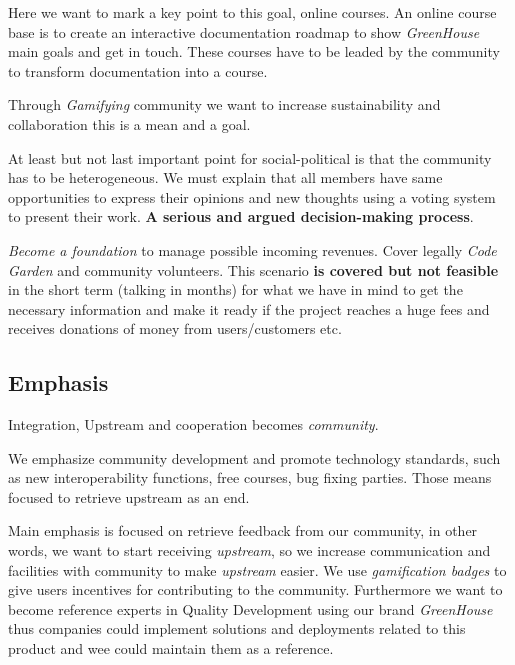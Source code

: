 \documentclass[11pt]{scrartcl}
\begin{document}
\par Here we want to mark a key point to this goal, online courses. An online course base is to create an interactive documentation roadmap to show \emph{GreenHouse} main goals and get in touch. These courses have to be leaded by the community to transform documentation into a course.

\par Through \emph{Gamifying} community we want to increase sustainability and collaboration this is a mean and a goal.

\par At least but not last important point for social-political is that the community has to be heterogeneous. We must explain that all members have same opportunities to express their opinions and new thoughts using a voting system to present their work. \textbf{A serious and argued decision-making process}.

\par \emph{Become a foundation} to manage possible incoming revenues. Cover legally \emph{Code Garden} and community volunteers. This scenario \textbf{is covered but not feasible} in the short term (talking in months) for what we have in mind to get the necessary information and make it ready if the project reaches a huge fees and receives donations of money from users/customers etc.


\subsection{Emphasis}
\label{sub:emphasis}

\par Integration, Upstream and cooperation becomes \emph{community}.

\par We emphasize community development and promote technology standards, such as new interoperability functions, free courses, bug fixing parties. Those means focused to retrieve upstream as an end.

\par Main emphasis is focused on retrieve feedback from our community, in other words, we want to start receiving \emph{upstream}, so we increase communication and facilities with community to make \emph{upstream} easier. We use \emph{gamification badges} to give users incentives for contributing to the community. Furthermore we want to become reference experts in Quality Development using our brand \emph{GreenHouse} thus companies could implement solutions and deployments related to this product and wee could maintain them as a reference.
\end{document}
